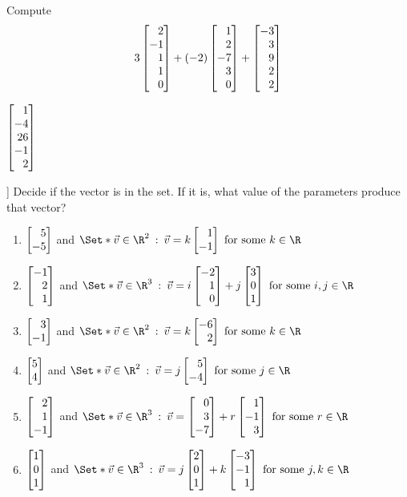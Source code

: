 \begin{exercises}
\begin{problist}
		\prob
		Compute
		\[
			3\mat{2\\-1\\1\\1\\0}+
			(-2)\mat{1\\2\\-7\\3\\0}+
			\mat{-3\\3\\9\\2\\2}
		\]
		\begin{solution}
		    $\mat{1\\-4\\26\\-1\\2}$
		\end{solution}

		\prob[\hefferon[2.21,2.22]]
			Decide if the vector is in the set. If it is, what value of the
			parameters produce that vector?
			\begin{enumerate}
				\item
					$\mat{5\\-5}$ and
					$\Set*{\vec v\in\R^2 \given
					\vec v=k\mat{1\\-1}\text{ for some }k\in\R}$
				\item $\mat{-1 \\ 2 \\ 1}$ and
					$\Set*{\vec v\in\R^3\given
						\vec v=i\mat{-2 \\ 1 \\ 0} +j\mat{3 \\ 0 \\ 1}
						\text{ for some }i,j\in\R
					}$
					\item
						$\mat{3 \\ -1}$ and $\Set*{ \vec v\in\R^2\given
							\vec v=k\mat{-6 \\ 2}\text{ for some } k\in\R
						}$
					\item
						$\mat{5 \\ 4}$ and
						$\Set*{\vec v\in\R^2\given
							\vec v=j\mat{5 \\ -4}\text{ for some }j\in\R
						}$
					\item $\mat{2 \\ 1 \\ -1}$ and
						$\Set*{\vec v\in\R^3
							\given \vec v= \mat{0 \\ 3 \\ -7} +r\mat{1 \\ -1 \\ 3}
							\text{ for some }r\in\R
						}$
					\item $\mat{1 \\ 0 \\ 1}$ and
						$\Set*{\vec v\in\R^3\given
							\vec v= j\mat{2 \\ 0 \\ 1} +k\mat{-3 \\ -1 \\ 1}
							\text{ for some }j,k\in\R
						}$
			\end{enumerate}


\end{problist}
\end{exercises}
